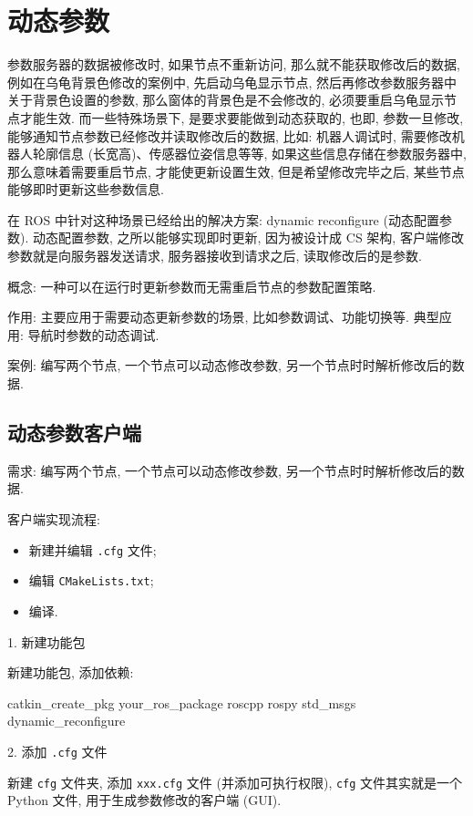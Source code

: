 \documentclass[openany, fontset=windowsold]{ctexbook}
\theoremstyle{kaiti}
\theoremstyle{normal}
\begin{document}
\section{动态参数}

参数服务器的数据被修改时, 如果节点不重新访问, 那么就不能获取修改后的数据, 例如在乌龟背景色修改的案例中, 先启动乌龟显示节点, 然后再修改参数服务器中关于背景色设置的参数, 那么窗体的背景色是不会修改的, 必须要重启乌龟显示节点才能生效. 而一些特殊场景下, 是要求要能做到动态获取的, 也即, 参数一旦修改, 能够通知节点参数已经修改并读取修改后的数据, 比如: 机器人调试时, 需要修改机器人轮廓信息 (长宽高)、传感器位姿信息等等, 如果这些信息存储在参数服务器中, 那么意味着需要重启节点, 才能使更新设置生效, 但是希望修改完毕之后, 某些节点能够即时更新这些参数信息.

在 ROS 中针对这种场景已经给出的解决方案: dynamic reconfigure (动态配置参数). 动态配置参数, 之所以能够实现即时更新, 因为被设计成 CS 架构, 客户端修改参数就是向服务器发送请求, 服务器接收到请求之后, 读取修改后的是参数.

概念: 一种可以在运行时更新参数而无需重启节点的参数配置策略.

作用: 主要应用于需要动态更新参数的场景, 比如参数调试、功能切换等. 典型应用: 导航时参数的动态调试.

案例: 编写两个节点, 一个节点可以动态修改参数, 另一个节点时时解析修改后的数据.

\subsection{动态参数客户端}

需求: 编写两个节点, 一个节点可以动态修改参数, 另一个节点时时解析修改后的数据.

客户端实现流程:

\begin{itemize}
  \item 新建并编辑 \verb|.cfg| 文件;
  \item 编辑 \verb|CMakeLists.txt|;
  \item 编译.
\end{itemize}

1. 新建功能包

新建功能包, 添加依赖:

\begin{bash}
  catkin_create_pkg your_ros_package roscpp rospy std_msgs dynamic_reconfigure
\end{bash}

2. 添加 \verb|.cfg| 文件

新建 \verb|cfg| 文件夹, 添加 \verb|xxx.cfg| 文件 (并添加可执行权限), \verb|cfg| 文件其实就是一个 Python 文件, 用于生成参数修改的客户端 (GUI).
\end{document}
